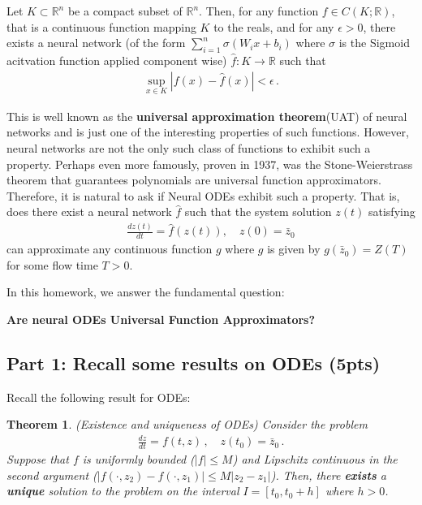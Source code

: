 \documentclass[12pt,letterpaper, onecolumn]{exam}
\newtheorem{theorem}{Theorem}
\theoremstyle{definition}
\begin{document}
Let $K \subset \mathbb{R}^n$ be a compact subset of $\mathbb{R}^n$. Then, for any function $f \in C(K; \mathbb{R})$, that is a continuous function mapping $K$ to the reals, and for any $\epsilon > 0$, there exists a neural network (of the form $\sum_{i=1}^n\sigma(W_ix+b_i)$ where $\sigma$ is the Sigmoid acitvation function applied component wise) $\hat{f}: K \to \mathbb{R}$ such that 
\begin{align}
    \sup_{x \in K}|f(x) - \hat{f}(x)| < \epsilon\,. 
\end{align}

This is well known as the \textbf{universal approximation theorem}(UAT) of neural networks and is just one of the interesting properties of such functions. However, neural networks are not the only such class of functions to exhibit such a property. Perhaps even more famously, proven in 1937, was the Stone-Weierstrass theorem that guarantees polynomials are universal function approximators. Therefore, it is natural to ask if Neural ODEs exhibit such a property. That is, does there exist a neural network $\hat{f}$ such that the system solution $z(t)$ satisfying 
\begin{align}
    \frac{d z(t)}{dt} = \hat{f}(z(t)), \quad z(0) = \bar{z}_0
\end{align}
can approximate any continuous function $g$ where $g$ is given by $g(\bar{z}_0) = Z(T)$ for some flow time $T > 0$. 

In this homework, we answer the fundamental question:
\begin{tcolorbox} \centering
\textbf{Are neural ODEs Universal Function Approximators?}
\end{tcolorbox}

\subsection{Part 1: Recall some results on ODEs (5pts)}
Recall the following result for ODEs:
\begin{theorem} \label{thm:1} (Existence and uniqueness of ODEs)
    Consider the problem
    \begin{align} \label{eq:ode-prob}
        \frac{dz}{dt} = f(t, z)\,, \quad z(t_0) = \bar{z}_0\,. 
    \end{align}
    Suppose that $f$ is uniformly bounded ($|f| \leq M$) and Lipschitz continuous in the second argument ($|f(\cdot, z_2) - f(\cdot, z_1)| \leq M |z_2-z_1|$). Then, there \textbf{exists} a \textbf{unique} solution to the problem on the interval $I = [t_0, t_0 + h]$ where $h > 0$. 
    
\end{theorem}
\end{document}
